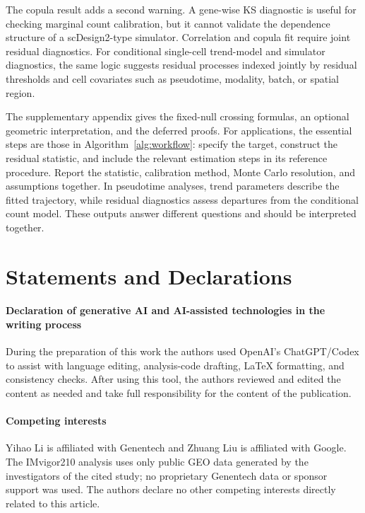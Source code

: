 \documentclass[preprint,12pt]{elsarticle}
\theoremstyle{plain}
\theoremstyle{remark}
\begin{document}
The copula result adds a second warning. A gene-wise KS diagnostic is useful for
checking marginal count calibration, but it cannot validate the dependence
structure of a scDesign2-type simulator. Correlation and copula fit require
joint residual diagnostics. For conditional single-cell trend-model and simulator diagnostics,
the same logic suggests residual processes indexed jointly by residual
thresholds and cell covariates such as pseudotime, modality, batch, or spatial
region.

The supplementary appendix gives the fixed-null crossing formulas, an optional
geometric interpretation, and the deferred proofs. For applications, the
essential steps are those in Algorithm~\ref{alg:workflow}: specify the target,
construct the residual statistic, and include the relevant estimation steps
in its reference procedure. Report the statistic, calibration method,
Monte Carlo resolution, and assumptions together. In pseudotime analyses,
trend parameters describe the fitted trajectory, while residual diagnostics
assess departures from the conditional count model. These outputs answer
different questions and should be interpreted together.

\section*{Statements and Declarations}

\paragraph{Declaration of generative AI and AI-assisted technologies in the writing process}
During the preparation of this work the authors used OpenAI's ChatGPT/Codex
to assist with language editing, analysis-code drafting, LaTeX formatting,
and consistency checks.
After using this tool, the authors reviewed and edited the content as needed
and take full responsibility for the content of the publication.

\paragraph{Competing interests}
Yihao Li is affiliated with Genentech and Zhuang Liu is affiliated with Google.
The IMvigor210 analysis uses only public GEO data generated by the investigators
of the cited study; no proprietary Genentech data or sponsor support was used.
The authors declare no other competing interests directly related to this
article.
\end{document}
